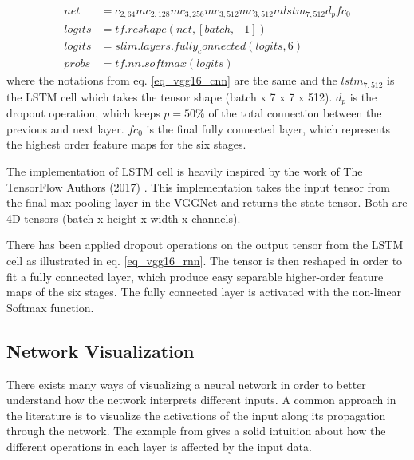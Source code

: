 \begin{equation}
\begin{aligned}
net &= c_{2,64}mc_{2,128}mc_{3,256}mc_{3,512}mc_{3,512}m lstm_{7,512} d_p fc_0\\
logits &=  tf.reshape(net, [batch, -1])\\
logits &= slim.layers.fully_connected(logits, 6) \\
probs &= tf.nn.softmax(logits)
\end{aligned}
\label{eq_vgg16_rnn}
\end{equation}
where the notations from eq. \ref{eq_vgg16_cnn} are the same and the $lstm_{7,512}$ is the LSTM cell   which takes the tensor shape (batch x 7 x 7 x 512). $d_p$ is the dropout operation, which keeps  $p = 50\%$ of the total connection between the previous and next layer. $fc_0$ is the final fully connected layer, which represents the highest order feature maps for the six stages.

The implementation of LSTM cell is heavily inspired by the work of The TensorFlow Authors (2017) \cite{git_lstm}. This implementation takes the input tensor from the final max pooling layer in the VGGNet and returns the state tensor. Both are 4D-tensors (batch x height x width x channels).

There has been applied dropout operations on the output tensor from the LSTM cell as illustrated in eq. \ref{eq_vgg16_rnn}. The tensor is then reshaped in order to fit a fully connected layer, which produce easy separable higher-order feature maps of the six stages. The fully connected layer is activated with the non-linear Softmax function.

\subsection{Network Visualization}

There exists many ways of visualizing a neural network in order to better understand how the network interprets different inputs.  
A common approach in the literature is to visualize the activations of the input along its propagation through the network. 
The example from \cite{stand_cnn} gives a solid intuition about how the different operations in each layer is affected by the input data.

